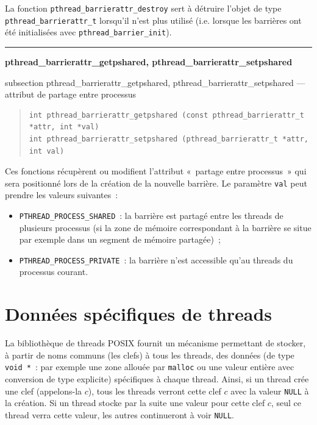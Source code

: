 \documentclass [twoside] {report}
\newcommand {\primitive} [1]
    {
	\phantomsection
	{\large \textbf {#1}}
	\addcontentsline {toc} {subsection} {#1}
    }
\newcommand {\separation}
    {
	\vspace {5mm}
	\nopagebreak
	\hrule
    }
\begin{document}
La fonction \verb|pthread_barrierattr_destroy| sert à détruire
l'objet de type \verb|pthread_barrierattr_t| lorsqu'il n'est plus
utilisé (i.e.  lorsque les barrières ont été initialisées avec
\verb|pthread_barrier_init|).


\separation
\primitive {pthread\_barrierattr\_getpshared, pthread\_barrierattr\_setpshared} --- attribut de partage entre processus

\begin {quote}
\begin {verbatim}
int pthread_barrierattr_getpshared (const pthread_barrierattr_t *attr, int *val)
int pthread_barrierattr_setpshared (pthread_barrierattr_t *attr, int val)
\end{verbatim}
\end {quote}

Ces fonctions récupèrent ou modifient l'attribut «~partage entre
processus~» qui sera positionné lors de la création de la nouvelle
barrière. Le paramètre \texttt {val} peut prendre les valeurs suivantes~:

\begin {itemize}
    \item \verb|PTHREAD_PROCESS_SHARED|~: la barrière
	est partagé entre les threads de plusieurs processus (si la zone
	de mémoire correspondant à la barrière se situe par exemple dans un
	segment de mémoire partagée)~;
    \item \verb|PTHREAD_PROCESS_PRIVATE|~: la barrière n'est accessible
	qu'au threads du processus courant.
\end {itemize}


\section {Données spécifiques de threads}

La bibliothèque de threads POSIX fournit un mécanisme permettant de
stocker, à partir de noms communs (les clefs) à tous les threads,
des données (de type \verb|void *|~: par exemple une zone allouée
par \texttt {malloc} ou une valeur entière avec conversion de type
explicite) spécifiques à chaque thread. Ainsi, si un thread crée une
clef (appelons-la $c$), tous les threads verront cette clef $c$ avec
la valeur \texttt {NULL} à la création.  Si un thread stocke par la
suite une valeur pour cette clef $c$, seul ce thread verra cette valeur,
les autres continueront à voir \texttt {NULL}.
\end{document}

